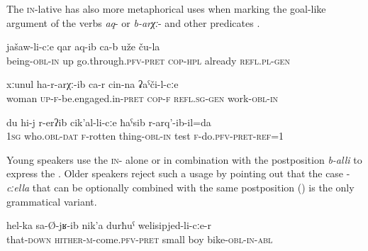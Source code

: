 The \textsc{in}-lative has also more metaphorical uses when marking the goal-like argument of the verbs \textit{aq}-   or \textit{b-arχː}-   and other predicates .
%
\begin{exe}
	\ex	\label{They dedicated themselves to their life (i.e. they cared for their living}
	\gll	jašaw-li-cːe	qar	aq-ib ca-b	uže	ču-la\\
		being-\textsc{obl-in}	up	go.through.\textsc{pfv}-\textsc{pret} \textsc{cop-hpl}	already	\textsc{refl}.\textsc{pl}-\textsc{gen}\\
	\glt	{}

	\ex	\label{The wife is engaged in her work}
	\gll	xːunul	ha-r-arχː-ib ca-r	cin-na	ʡaˁči-l-cːe \\
		woman	\textsc{up-f}-be.engaged.in-\textsc{pret} \textsc{cop-f}	\textsc{refl}.\textsc{sg}-\textsc{gen}	work-\textsc{obl-in}\\
	\glt	{}

	\ex	\label{Other (people) considered myself as rotten}
	\gll	du	hi-j	r-erʔib	cik'al-li-cːe	ħaˁsib	r-arq'-ib-il=da\\
		1\textsc{sg}	who.\textsc{obl}-\textsc{dat}	\textsc{f}-rotten	thing-\textsc{obl-in}	test	\textsc{f}-do.\textsc{pfv}-\textsc{pret}-\textsc{ref}=1\\
	\glt	{}
\end{exe}

Young speakers use the \textsc{in}- alone  or in combination with the postposition \textit{b-alli}  to express the . Older speakers reject such a usage by pointing out that the  case -\textit{cːella} that can be optionally combined with the same postposition () is the only grammatical variant.
%
\begin{exe}
	\ex	\label{From over there a little boy with a bike came}
	\gll	hel-ka	sa-Ø-jʁ-ib	nik'a	durħuˁ	welisipjed-li-cːe-r\\
		that-\textsc{down}	\textsc{hither-m}-come.\textsc{pfv}-\textsc{pret}	small	boy	bike-\textsc{obl}-\textsc{in}-\textsc{abl}\\
	\glt	{}
\end{exe}

